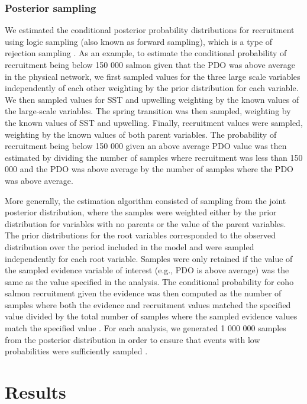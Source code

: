 \subsubsection{Posterior sampling}

We estimated the conditional posterior probability distributions for recruitment
using logic sampling (also known as forward sampling), which is a type of
rejection sampling \citep{Henrion1988a, Korb2004a}. As an example, to estimate
the conditional probability of recruitment being below 150 000 salmon given that
the PDO was above average in the physical network, we first sampled values for
the three large scale variables independently of each other weighting by the
prior distribution for each variable. We then sampled values for SST and
upwelling weighting by the known values of the large-scale variables.  The
spring transition was then sampled, weighting by the known values of SST and
upwelling. Finally, recruitment values were sampled, weighting by the known
values of both parent variables. The probability of recruitment being below 150
000 given an above average PDO value was then estimated by dividing the number
of samples where recruitment was less than 150 000 and the PDO was above average
by the number of samples where the PDO was above average.

More generally, the estimation algorithm consisted of sampling from the joint
posterior distribution, where the samples were weighted either by the prior
distribution for variables with no parents or the value of the parent variables.
The prior distributions for the root variables corresponded to the observed
distribution over the period included in the model and were sampled
independently for each root variable. Samples were only retained if the value of
the sampled evidence variable of interest (e.g., PDO is above average) was the
same as the value specified in the analysis. The conditional probability for
coho salmon recruitment given the evidence was then computed as the number of
samples where both the evidence and recruitment values matched the specified
value divided by the total number of samples where the sampled evidence values
match the specified value \citep{Henrion1988a}. For each analysis, we generated
1 000 000 samples from the posterior distribution in order to ensure that events
with low probabilities were sufficiently sampled \citep{Koller2009a}.



\section{Results}

